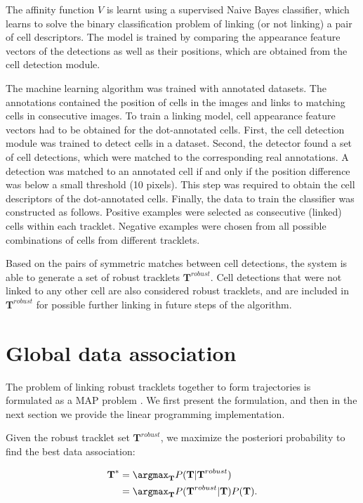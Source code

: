 		The affinity function $V$ is learnt using a supervised Naive Bayes classifier, which learns to solve the binary classification problem of linking (or not linking) a pair of cell descriptors. The model is trained by comparing the appearance feature vectors of the detections as well as their positions, which are obtained from the cell detection module.
		
		The machine learning algorithm was trained with annotated datasets. The annotations contained the position of cells in the images and links to matching cells in consecutive images. To train a linking model, cell appearance feature vectors had to be obtained for the dot-annotated cells. First, the cell detection module was trained to detect cells in a dataset. Second, the detector found a set of cell detections, which were matched to the corresponding real annotations. A detection was matched to an annotated cell if and only if the position difference was below a small threshold (10 pixels). This step was required to obtain the cell descriptors of the dot-annotated cells. Finally, the data to train the classifier was constructed as follows. Positive examples were selected as consecutive (linked) cells within each tracklet. Negative examples were chosen from all possible combinations of cells from different tracklets.

		Based on the pairs of symmetric matches between cell detections, the system is able to generate a set of robust tracklets $\textbf{T}^{robust}$. Cell detections that were not linked to any other cell are also considered robust tracklets, and are included in $\textbf{T}^{robust}$ for possible further linking in future steps of the algorithm.
		
	\section{Global data association}
		\label{sec:globaldataassoc}
		The problem of linking robust tracklets together to form trajectories is formulated as a MAP problem \cite{bise11global,zhang08,huang08}. We first present the formulation, and then in the next section we provide the linear programming implementation.
		
		Given the robust tracklet set $ \textbf{T}^{robust} $, we maximize the posteriori probability to find the best data association:
		
		\begin{align*}
			\textbf{T}^* &= \argmax_{\textbf{T}} P(\textbf{T} | \textbf{T}^{robust}) \\
			            &= \argmax_{\textbf{T}} P(\textbf{T}^{robust} | \textbf{T} ) P(\textbf{T}) \text{.}
		\end{align*}
				
